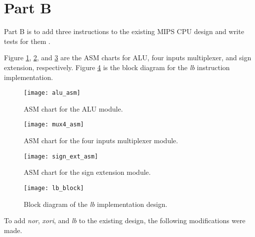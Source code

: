 \newpage
\section{Part B}

Part B is to add three instructions to the existing MIPS CPU design and write tests for them \cite{ref:assignment_brief}.

Figure \ref{fig:alu_asm}, \ref{fig:mux4_asm}, and \ref{fig:sign_ext_asm} are the ASM charts for ALU, four inputs multiplexer, and sign extension, respectively. Figure \ref{fig:lb_block} is the block diagram for the \textit{lb} instruction implementation.

\begin{figure}[htbp]
   \centering
   \texttt{[image: alu\_asm]}
   \caption{ASM chart for the ALU module.}
   \label{fig:alu_asm}
\end{figure}

\begin{figure}[htbp]
   \centering
   \texttt{[image: mux4\_asm]}
   \caption{ASM chart for the four inputs multiplexer module.}
   \label{fig:mux4_asm}
\end{figure}

\begin{figure}[htbp]
   \centering
   \texttt{[image: sign\_ext\_asm]}
   \caption{ASM chart for the sign extension module.}
   \label{fig:sign_ext_asm}
\end{figure}

\begin{figure}[htbp]
   \centering
   \texttt{[image: lb\_block]}
   \caption{Block diagram of the \textit{lb} implementation design.}
   \label{fig:lb_block}
\end{figure}

\newpage

To add \textit{nor}, \textit{xori}, and \textit{lb} to the existing design, the following modifications were made.

